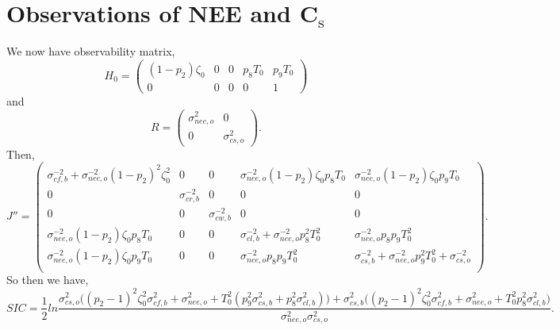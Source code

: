 \documentclass[11pt]{article}
\begin{document}
\section*{Observations of NEE and C$_\text{s}$}
We now have observability matrix,
\[
H_{0} = \begin{pmatrix}
(1-p_{2})\zeta_0 & 0 & 0 & p_{8}T_{0} & p_{9}T_{0}\\
0 & 0 & 0 & 0 & 1
\end{pmatrix}
\]
and 
\[
R= \begin{pmatrix}
\sigma_{nee,o}^{2} & 0 \\
0 & \sigma_{cs,o}^{2}
\end{pmatrix}.
\]
Then,
\[
J'' = \begin{pmatrix}
\sigma_{cf,b}^{-2}+\sigma_{nee,o}^{-2}(1-p_{2})^{2}\zeta_0^{2} & 0 & 0 & \sigma_{nee,o}^{-2}(1-p_{2})\zeta_0 p_{8}T_0 & \sigma_{nee,o}^{-2}(1-p_{2})\zeta_0 p_{9}T_0 \\
0 & \sigma_{cr,b}^{-2} & 0 & 0 & 0 \\
0 & 0 & \sigma_{cw,b}^{-2} & 0 & 0 \\
\sigma_{nee,o}^{-2}(1-p_{2})\zeta_0 p_{8}T_0 & 0 & 0 & \sigma_{cl,b}^{-2}+\sigma_{nee,o}^{-2}p_{8}^2 T_0^2 & \sigma_{nee,o}^{-2}p_{8}p_{9} T_0^2 \\
\sigma_{nee,o}^{-2}(1-p_{2})\zeta_0 p_{9}T_0 & 0 & 0 & \sigma_{nee,o}^{-2}p_{8}p_{9} T_0^2 & \sigma_{cs,b}^{-2}+\sigma_{nee,o}^{-2}p_{9}^2 T_0^2+\sigma_{cs,o}^{-2} \\
\end{pmatrix}.
\]
So then we have,
\[
SIC = \frac{1}{2}ln\frac{\sigma_{cs,o}^2\big((p_{2}-1)^{2}\zeta_0^{2}\sigma_{cf,b}^{2}+\sigma_{nee,o}^{2}+T_{0}^2(p_{9}^2\sigma_{cs,b}^2+p_8^2\sigma_{cl,b}^2)\big)+\sigma_{cs,b}^2\big((p_{2}-1)^{2}\zeta_0^{2}\sigma_{cf,b}^{2}+\sigma_{nee,o}^{2}+T_{0}^2 p_{8}^2\sigma_{cl,b}^2\big)}{\sigma_{nee,o}^{2}\sigma_{cs,o}^2}.
\]
\end{document}
